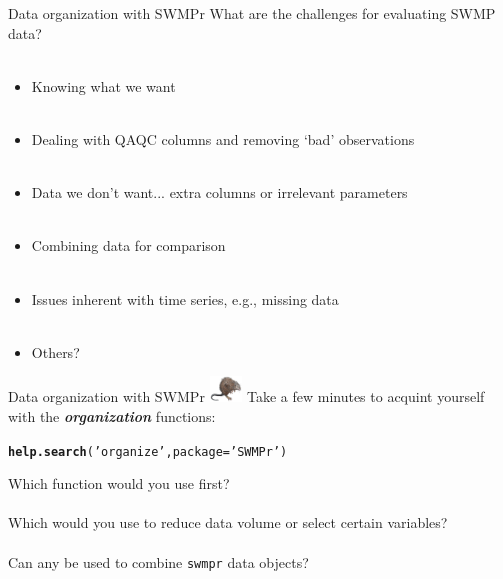 \documentclass[xcolor=dvipsnames]{beamer}\usepackage[]{graphicx}\usepackage[]{color}
\makeatletter
\newcommand{\hlstr}[1]{\textcolor[rgb]{0.192,0.494,0.8}{#1}}%
\newcommand{\hlstd}[1]{\textcolor[rgb]{0.345,0.345,0.345}{#1}}%
\newcommand{\hlkwc}[1]{\textcolor[rgb]{0.333,0.667,0.333}{#1}}%
\newcommand{\hlkwd}[1]{\textcolor[rgb]{0.737,0.353,0.396}{\textbf{#1}}}%
\newenvironment{kframe}{%
 \def\at@end@of@kframe{}%
 \ifinner\ifhmode%
  \def\at@end@of@kframe{\end{minipage}}%
  \begin{minipage}{\columnwidth}%
 \fi\fi%
 \def\FrameCommand##1{\hskip\@totalleftmargin \hskip-\fboxsep
 \colorbox{shadecolor}{##1}\hskip-\fboxsep
     \hskip-\linewidth \hskip-\@totalleftmargin \hskip\columnwidth}%
 \MakeFramed {\advance\hsize-\width
   \@totalleftmargin\z@ \linewidth\hsize
   \@setminipage}}%
 {\par\unskip\endMakeFramed%
 \at@end@of@kframe}
\newenvironment{knitrout}{}{} %
\newcommand{\Bigtxt}[1]{\textbf{\textit{#1}}}
\makeatother
\begin{document}
\begin{frame}[t]{Data organization with SWMPr}
\onslide<+->
What are the challenges for evaluating SWMP data? \\~\\
\onslide<+->
\begin{itemize}
\item Knowing what we want \\~\\
\item Dealing with QAQC columns and removing `bad' observations \\~\\
\item Data we don't want... extra columns or irrelevant parameters \\~\\
\item Combining data for comparison\\~\\
\item Issues inherent with time series, e.g., missing data \\~\\
\item Others?
\end{itemize}
\end{frame}

\begin{frame}[fragile]{Data organization with SWMPr \includegraphics[width = 0.065\textwidth]{imgs/swmprat.png}}
\onslide<+->
Take a few minutes to acquint yourself with the \Bigtxt{organization} functions:
\begin{knitrout}\scriptsize
{}\color{fgcolor}\begin{kframe}
\begin{alltt}
\hlkwd{help.search}\hlstd{(}\hlstr{'organize'}\hlstd{,} \hlkwc{package} \hlstd{=} \hlstr{'SWMPr'}\hlstd{)}
\end{alltt}
\end{kframe}
\end{knitrout}
\onslide<+->
Which function would you use first? \\~\\
Which would you use to reduce data volume or select certain variables? \\~\\
Can any be used to combine \texttt{swmpr} data objects? 
\end{frame}
\end{document}
